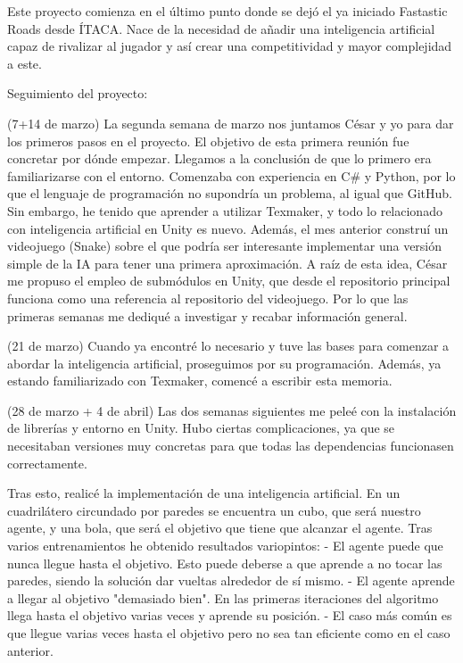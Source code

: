 
Este proyecto comienza en el último punto donde se dejó el ya iniciado Fastastic Roads desde ÍTACA. Nace de la necesidad de añadir una inteligencia artificial capaz de rivalizar al jugador y así crear una competitividad y mayor complejidad a este.

Seguimiento del proyecto:

(7+14 de marzo)
La segunda semana de marzo nos juntamos César y yo para dar los primeros pasos en el proyecto. El objetivo de esta primera reunión fue concretar por dónde empezar. Llegamos a la conclusión de que lo primero era familiarizarse con el entorno. Comenzaba con experiencia en C\# y Python, por lo que el lenguaje de programación no supondría un problema, al igual que GitHub. Sin embargo, he tenido que aprender a utilizar Texmaker, y todo lo relacionado con inteligencia artificial en Unity es nuevo. 
Además, el mes anterior construí un videojuego (Snake) sobre el que podría ser interesante implementar una versión simple de la IA para tener una primera aproximación.
A raíz de esta idea, César me propuso el empleo de submódulos en Unity, que desde el repositorio principal funciona como una referencia al repositorio del videojuego.
Por lo que las primeras semanas me dediqué a investigar y recabar información general.

(21 de marzo)
Cuando ya encontré lo necesario y tuve las bases para comenzar a abordar la inteligencia artificial, proseguimos por su programación. 
Además, ya estando familiarizado con Texmaker, comencé a escribir esta memoria.

(28 de marzo + 4 de abril)
Las dos semanas siguientes me peleé con la instalación de librerías y entorno en Unity. Hubo ciertas complicaciones, ya que se necesitaban versiones muy concretas para que todas las dependencias funcionasen correctamente. 

Tras esto, realicé la implementación de una inteligencia artificial. En un cuadrilátero circundado por paredes se encuentra un cubo, que será nuestro agente, y una bola, que será el objetivo que tiene que alcanzar el agente.
Tras varios entrenamientos he obtenido resultados variopintos:
- El agente puede que nunca llegue hasta el objetivo. Esto puede deberse a que  aprende a no tocar las paredes, siendo la solución dar vueltas alrededor de sí mismo.
- El agente aprende a llegar al objetivo "demasiado bien". En las primeras iteraciones del algoritmo llega hasta el objetivo varias veces y aprende su posición.
- El caso más común es que llegue varias veces hasta el objetivo pero no sea tan eficiente como en el caso anterior.